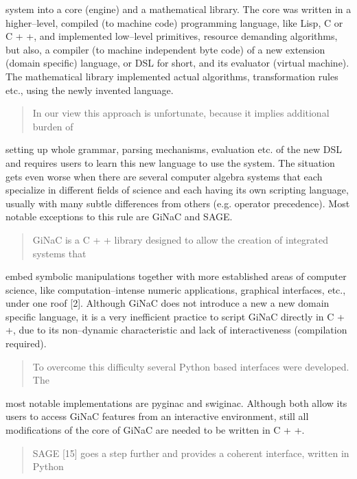 system into a core (engine) and a mathematical library. The core was written in
a higher–level, compiled (to machine code) programming language, like Lisp, C or
C + +, and implemented low–level primitives, resource demanding algorithms, but
also, a compiler (to machine independent byte code) of a new extension (domain
specific) language, or DSL for short, and its evaluator (virtual machine). The
mathematical library implemented actual algorithms, transformation rules etc., using
the newly invented language.
\begin{quote}

In our view this approach is unfortunate, because it implies additional burden of
\end{quote}

setting up whole grammar, parsing mechanisms, evaluation etc. of the new DSL and
requires users to learn this new language to use the system. The situation gets even
worse when there are several computer algebra systems that each specialize in
different fields of science and each having its own scripting language, usually with
many subtle differences from others (e.g. operator precedence). Most notable
exceptions to this rule are GiNaC and SAGE.
\begin{quote}

GiNaC is a C + + library designed to allow the creation of integrated systems that
\end{quote}

embed symbolic manipulations together with more established areas of computer
science, like computation–intense numeric applications, graphical interfaces, etc.,
under one roof {[}2{]}. Although GiNaC does not introduce a new a new domain specific
language, it is a very inefficient practice to script GiNaC directly in C + +, due to its
non--dynamic characteristic and lack of interactiveness (compilation required).
\begin{quote}

To overcome this difficulty several Python based interfaces were developed. The
\end{quote}

most notable implementations are pyginac and swiginac. Although both allow its users
to access GiNaC features from an interactive environment, still all modifications of
the core of GiNaC are needed to be written in C + +.
\begin{quote}

SAGE {[}15{]} goes a step further and provides a coherent interface, written in Python
\end{quote}

